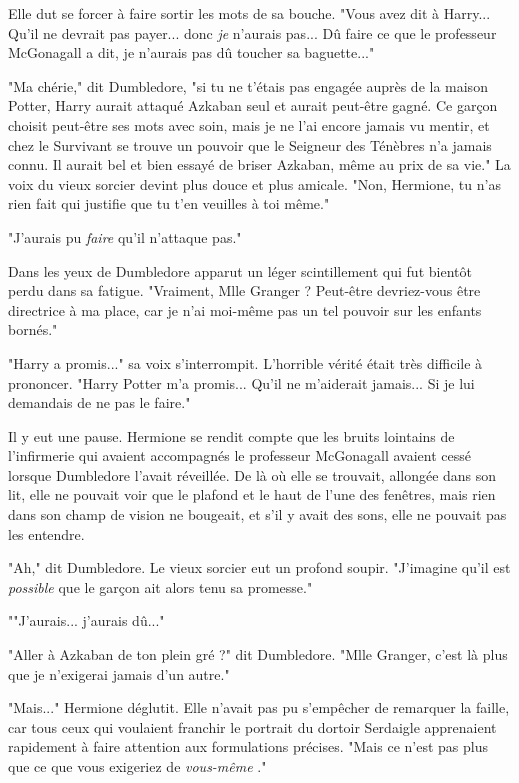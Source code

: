 Elle dut se forcer à faire sortir les mots de sa bouche. "Vous avez dit à Harry... Qu'il ne devrait pas payer... donc \emph{je } n'aurais pas... Dû faire ce que le professeur McGonagall a dit, je n'aurais pas dû toucher sa baguette..."

"Ma chérie," dit Dumbledore, "si tu ne t'étais pas engagée auprès de la maison Potter, Harry aurait attaqué Azkaban seul et aurait peut-être gagné. Ce garçon choisit peut-être ses mots avec soin, mais je ne l'ai encore jamais vu mentir, et chez le Survivant se trouve un pouvoir que le Seigneur des Ténèbres n'a jamais connu. Il aurait bel et bien essayé de briser Azkaban, même au prix de sa vie." La voix du vieux sorcier devint plus douce et plus amicale. "Non, Hermione, tu n'as rien fait qui justifie que tu t'en veuilles à toi même."

"J'aurais pu \emph{faire}  qu'il n'attaque pas."

Dans les yeux de Dumbledore apparut un léger scintillement qui fut bientôt perdu dans sa fatigue. "Vraiment, Mlle Granger ? Peut-être devriez-vous être directrice à ma place, car je n'ai moi-même pas un tel pouvoir sur les enfants bornés."

"Harry a promis..." sa voix s'interrompit. L'horrible vérité était très difficile à prononcer. "Harry Potter m'a promis... Qu'il ne m'aiderait jamais... Si je lui demandais de ne pas le faire."

Il y eut une pause. Hermione se rendit compte que les bruits lointains de l'infirmerie qui avaient accompagnés le professeur McGonagall avaient cessé lorsque Dumbledore l'avait réveillée. De là où elle se trouvait, allongée dans son lit, elle ne pouvait voir que le plafond et le haut de l'une des fenêtres, mais rien dans son champ de vision ne bougeait, et s'il y avait des sons, elle ne pouvait pas les entendre.

"Ah," dit Dumbledore. Le vieux sorcier eut un profond soupir. "J'imagine qu'il est \emph{possible}  que le garçon ait alors tenu sa promesse."

""J'aurais... j'aurais dû..."

"Aller à Azkaban de ton plein gré ?" dit Dumbledore. "Mlle Granger, c'est là plus que je n'exigerai jamais d'un autre."

"Mais..." Hermione déglutit. Elle n'avait pas pu s'empêcher de remarquer la faille, car tous ceux qui voulaient franchir le portrait du dortoir Serdaigle apprenaient rapidement à faire attention aux formulations précises. "Mais ce n'est pas plus que ce que vous exigeriez de \emph{vous-même} ."

